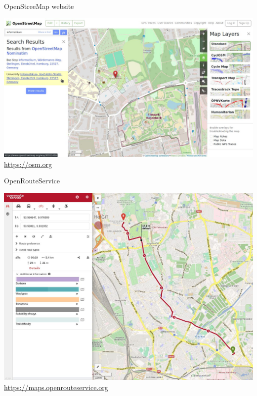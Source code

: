 \documentclass{beamer}
\begin{document}
			\begin{frame}{OpenStreeMap website}
				\begin{center}
					\includegraphics[height=0.7\textheight]{images/osm-website.jpg}\\
					\url{https://osm.org}
				\end{center}
			\end{frame}
			
			\begin{frame}{OpenRouteService}
				\begin{center}
					\includegraphics[height=0.7\textheight]{images/openrouteservice.jpg}\\
					\url{https://maps.openrouteservice.org}
				\end{center}
			\end{frame}
			
\end{document}

